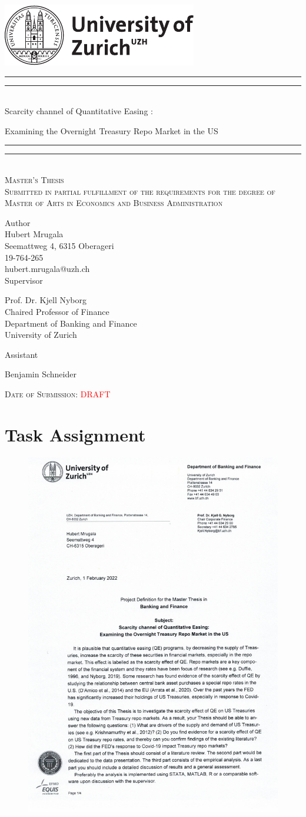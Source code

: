 \documentclass[11pt,a4paper,english,oneside]{article}
\makeatletter
\newcommand*{\plogo}{\includegraphics{./style/uzh_logo_e_pos}}
\newcommand*{\titleGP}{\begingroup %
\centering %
\vspace*{\baselineskip} %
\plogo\\[2\baselineskip] %
\rule{\textwidth}{1.6pt}\vspace*{-\baselineskip}\vspace*{2pt} %
\rule{\textwidth}{0.4pt}\\[\baselineskip] %
{\LARGE Scarcity channel of Quantitative Easing :}

\vspace*{3pt}

{\LARGE Examining the Overnight Treasury Repo Market in the US}\\[0.2\baselineskip] %
\rule{\textwidth}{0.4pt}\vspace*{-\baselineskip}\vspace{3.2pt} %
\rule{\textwidth}{1.6pt}\\[2\baselineskip] %
\scshape %
Master's Thesis\\[2\baselineskip]
Submitted in partial fulfillment of the requirements for the degree of Master of Arts in Economics and Business Administration \par
\vspace*{2\baselineskip}
Author\\
{\Large Hubert Mrugala \\ [5pt]
 }
Seemattweg 4, 6315 Oberageri \\[5pt]
19-764-265 \\[5pt]
hubert.mrugala@uzh.ch \\


\vspace*{2\baselineskip}
Supervisor\\
{\Large Prof. Dr. Kjell Nyborg\\[5pt]\small Chaired Professor of Finance\\[5pt]
\small Department of Banking and Finance\\[5pt]University of Zurich\par}
\vspace*{2\baselineskip}
Assistant\\
{\Large Benjamin Schneider \par}
\vfill
{\scshape Date of Submission: \textcolor{red}{DRAFT}} \\[0.3\baselineskip] %
\endgroup}
\makeatother
\begin{document}
\thispagestyle{empty}
\titleGP
\newpage
\doublespacing
\setcounter{page}{1}
\section*{Task Assignment}

\begin{figure}[h!]
  \begin{center}
    \includegraphics[page=1,width=.86\textwidth]{../../project_definition.pdf}
  \end{center}
\end{figure}
\newpage
\end{document}
